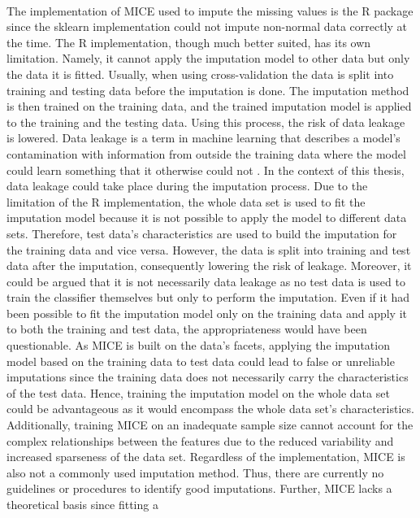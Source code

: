\\
The implementation of MICE used to impute the missing values is the R package 
 since the sklearn implementation could not impute 
non-normal data correctly at the time. The R implementation, 
though much better suited, has its own limitation. Namely, it cannot 
apply the imputation model to other data but only the data it is fitted. 
Usually, when using cross-validation the data is split into 
training and testing data before the imputation is done. The imputation method 
is then trained on the training data, and the trained imputation model is 
applied to the training and the testing data. Using this process, the 
risk of data leakage is lowered.
Data leakage is a term in machine learning 
that describes a model's contamination with information from outside the 
training data where the model could learn something that it otherwise could not 
\cite{RN199}.
In the context of this thesis, data leakage could take place during the 
imputation process. Due to the limitation of the R implementation, the whole 
data set is used to fit the imputation model because it is not possible to 
apply the model to different data sets. Therefore, test data's characteristics 
are used to build the imputation for the training data and vice 
versa. However, the data is split into training and test data after the 
imputation, consequently lowering the risk of leakage. Moreover, it could be 
argued that it is not necessarily data leakage as no test data is used to train 
the classifier themselves but only to perform the imputation.
Even if it had been possible to fit the imputation model only on the training 
data and apply it to both the training and test data, the appropriateness would 
have been questionable. As MICE is built on the data's facets, applying 
the imputation model based on the training data to test data could lead to 
false or unreliable imputations since the training data does not necessarily 
carry the characteristics of the test data. Hence, training the imputation 
model on the whole data set could be advantageous as it would encompass the 
whole data set's characteristics. Additionally, training MICE on an inadequate 
sample size cannot account for the complex relationships between the 
features due to the reduced variability and increased sparseness of the data 
set.
Regardless of the implementation, MICE is also not a commonly used imputation 
method. Thus, there are currently no guidelines or procedures to identify 
good imputations. Further, MICE lacks a theoretical basis since fitting a 
